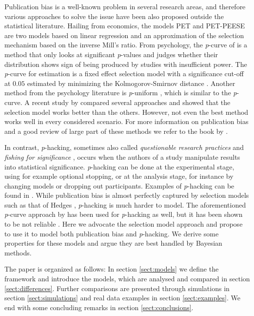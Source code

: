 \documentclass{article}
\theoremstyle{plain}
\theoremstyle{definition}
\begin{document}
Publication bias is a well-known problem in several research areas, and therefore various approaches to solve the issue have been also proposed outside the statistical literature. Hailing from economics, the models PET and PET-PEESE \citep{stanley2014meta,stanley2017limitations} are two models based on linear regression and an approximation of the selection mechanism based on the inverse Mill's ratio. From psychology, the \textit{p}-curve of \citet{simonsohn2014p} is a method that only looks at significant \textit{p}-values and judges whether their distribution shows sign of being produced by studies with insufficient power. The \textit{p}-curve for estimation \citep{simonsohn2014} is a fixed effect selection model with a significance cut-off at $0.05$ estimated by minimizing the Kolmogorov-Smirnov distance \citep{mcshane2016adjusting}. Another method from the psychology literature is \textit{p}-uniform \citep{van2015meta}, which is similar to the \textit{p}-curve. A recent study by \citet{carter2019correcting} compared several approaches and showed that the selection model works better than the others. However, not even the best method works well in every considered scenario. For more information on publication bias and a good review of large part of these methods we refer to the book by \citet{rothstein2006publication}.

In contrast, \textit{p}-hacking, sometimes also called \emph{questionable research practices} \citep{Sijtsma2016} and \emph{fishing for significance} \citep{Boulesteix2009}, occurs when the authors of a study manipulate results into statistical significance. \textit{p}-hacking can be done at the experimental stage, using for example optional stopping, or at the analysis stage, for instance by changing models or dropping out participants. Examples of \textit{p}-hacking can be found in \citet{simmons2011false}. While publication bias is almost perfectly captured by selection models such as that of Hedges \citeyearpar{hedges1992modeling}, \textit{p}-hacking is much harder to model. The aforementioned \textit{p}-curve approach by \citet{simonsohn2014p} has been used for \textit{p}-hacking as well, but it has been shown to be not reliable \citep{BrunsIoannidis2016}. Here we advocate the selection model approach and propose to use it to model both publication bias and \textit{p}-hacking. We derive some properties for these models and argue they are best handled by Bayesian methods. 

The paper is organized as follows: In section \ref{sect:models} we define the framework and introduce the models, which are analysed and compared in section \ref{sect:differences}. Further comparisons are presented through simulations in section \ref{sect:simulations} and real data examples in section \ref{sect:examples}. We end with some concluding remarks in section \ref{sect:conclusions}.
\end{document}
